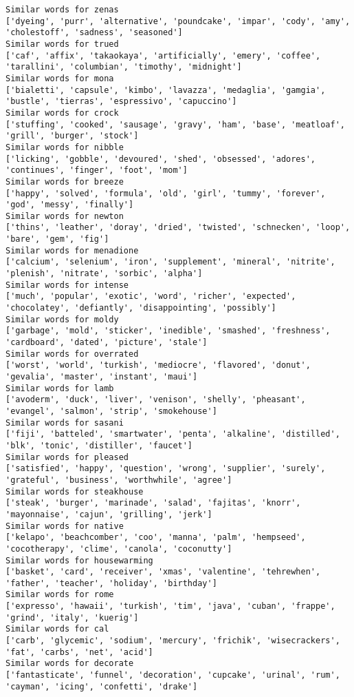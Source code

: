 \documentclass[11pt]{article}
\begin{document}
\begin{Verbatim}[commandchars=\\\{\}]
Similar words for zenas
['dyeing', 'purr', 'alternative', 'poundcake', 'impar', 'cody', 'amy', 'cholestoff', 'sadness', 'seasoned']
Similar words for trued
['caf', 'affix', 'takaokaya', 'artificially', 'emery', 'coffee', 'tarallini', 'columbian', 'timothy', 'midnight']
Similar words for mona
['bialetti', 'capsule', 'kimbo', 'lavazza', 'medaglia', 'gamgia', 'bustle', 'tierras', 'espressivo', 'capuccino']
Similar words for crock
['stuffing', 'cooked', 'sausage', 'gravy', 'ham', 'base', 'meatloaf', 'grill', 'burger', 'stock']
Similar words for nibble
['licking', 'gobble', 'devoured', 'shed', 'obsessed', 'adores', 'continues', 'finger', 'foot', 'mom']
Similar words for breeze
['happy', 'solved', 'formula', 'old', 'girl', 'tummy', 'forever', 'god', 'messy', 'finally']
Similar words for newton
['thins', 'leather', 'doray', 'dried', 'twisted', 'schnecken', 'loop', 'bare', 'gem', 'fig']
Similar words for menadione
['calcium', 'selenium', 'iron', 'supplement', 'mineral', 'nitrite', 'plenish', 'nitrate', 'sorbic', 'alpha']
Similar words for intense
['much', 'popular', 'exotic', 'word', 'richer', 'expected', 'chocolatey', 'defiantly', 'disappointing', 'possibly']
Similar words for moldy
['garbage', 'mold', 'sticker', 'inedible', 'smashed', 'freshness', 'cardboard', 'dated', 'picture', 'stale']
Similar words for overrated
['worst', 'world', 'turkish', 'mediocre', 'flavored', 'donut', 'gevalia', 'master', 'instant', 'maui']
Similar words for lamb
['avoderm', 'duck', 'liver', 'venison', 'shelly', 'pheasant', 'evangel', 'salmon', 'strip', 'smokehouse']
Similar words for sasani
['fiji', 'batteled', 'smartwater', 'penta', 'alkaline', 'distilled', 'blk', 'tonic', 'distiller', 'faucet']
Similar words for pleased
['satisfied', 'happy', 'question', 'wrong', 'supplier', 'surely', 'grateful', 'business', 'worthwhile', 'agree']
Similar words for steakhouse
['steak', 'burger', 'marinade', 'salad', 'fajitas', 'knorr', 'mayonnaise', 'cajun', 'grilling', 'jerk']
Similar words for native
['kelapo', 'beachcomber', 'coo', 'manna', 'palm', 'hempseed', 'cocotherapy', 'clime', 'canola', 'coconutty']
Similar words for housewarming
['basket', 'card', 'receiver', 'xmas', 'valentine', 'tehrewhen', 'father', 'teacher', 'holiday', 'birthday']
Similar words for rome
['expresso', 'hawaii', 'turkish', 'tim', 'java', 'cuban', 'frappe', 'grind', 'italy', 'kuerig']
Similar words for cal
['carb', 'glycemic', 'sodium', 'mercury', 'frichik', 'wisecrackers', 'fat', 'carbs', 'net', 'acid']
Similar words for decorate
['fantasticate', 'funnel', 'decoration', 'cupcake', 'urinal', 'rum', 'cayman', 'icing', 'confetti', 'drake']

\end{Verbatim}
\end{document}
